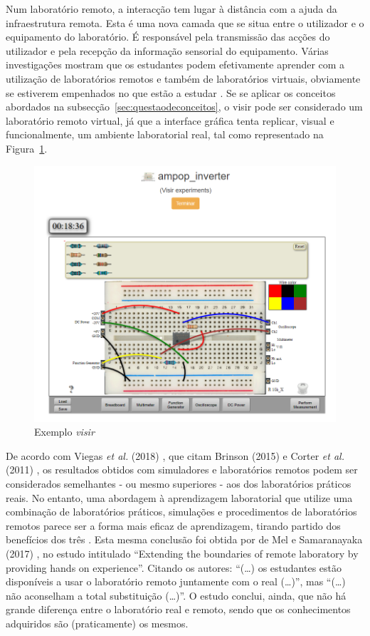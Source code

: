 Num laboratório remoto, a interacção tem lugar à distância com a ajuda da infraestrutura remota. Esta é uma nova camada que se situa entre o utilizador e o equipamento do laboratório. É responsável pela transmissão das acções do utilizador e pela recepção da informação sensorial do equipamento.
Várias investigações mostram que os estudantes podem efetivamente aprender com a utilização de laboratórios remotos e também de laboratórios virtuais, obviamente se estiverem empenhados no que estão a estudar \cite{RemoteLabsImpactVISIR}. Se se aplicar os conceitos abordados na subsecção~\ref{sec:questaodeconceitos}, o \acrshort{visir} pode ser considerado um laboratório remoto virtual, já que a interface gráfica tenta replicar, visual e funcionalmente, um ambiente laboratorial real, tal como representado na Figura~\ref{fig:exemplo_visir}. 

\begin{figure}[hbtp]
    \centering
    \includegraphics[width=0.4\linewidth]{figures/visir_sch.png}
    \caption{Exemplo \textit{\acrshort{visir}}}
    \label{fig:exemplo_visir}
\end{figure}

De acordo com Viegas \textit{et al.} (2018) \cite{ImpactRemoteLabTeachingPractices}, que citam Brinson (2015) \cite{BRINSON2015218} e Corter \textit{et al.} (2011) \cite{CORTER20112054}, os resultados obtidos com simuladores e laboratórios remotos podem ser considerados semelhantes - ou mesmo superiores - aos dos laboratórios práticos reais. No entanto, uma abordagem à aprendizagem laboratorial que utilize uma combinação de laboratórios práticos, simulações e procedimentos de laboratórios remotos parece ser a forma mais eficaz de aprendizagem, tirando partido dos benefícios dos três \cite{BRINSON2015218}. Esta mesma conclusão foi obtida por de Mel e Samaranayaka (2017) \cite{deMel}, no estudo intitulado ``Extending the boundaries of remote laboratory by providing hands on experience''. Citando os autores: ``(\ldots) os estudantes estão disponíveis a usar o laboratório remoto juntamente com o real (\ldots)'', mas ``(\ldots) não aconselham a total substituição (\ldots)''. O estudo conclui, ainda, que não há grande diferença entre o laboratório real e remoto, sendo que os conhecimentos adquiridos são (praticamente) os mesmos.

